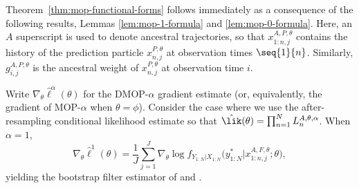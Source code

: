 

Theorem~\ref{thm:mop-functional-forms} follows immediately as a consequence of the following results, Lemmas \ref{lem:mop-1-formula} and \ref{lem:mop-0-formula}.
Here, an $A$ superscript is used to denote ancestral trajectories, so that $x_{1:n,j}^{A, P,\theta}$ contains the history of the prediction particle $x_{n,j}^{P,\theta}$ at observation times $\seq{1}{n}$.
Similarly, $g_{i,j}^{A,P,\theta}$ is the ancestral weight of $x_{n,j}^{P,\theta}$ at observation time $i$.

\begin{lem}
\label{lem:mop-1-formula}
Write $\nabla_\theta \hat\ell^\alpha(\theta)$ for the DMOP-$\alpha$ gradient estimate (or, equivalently, the gradient of MOP-$\alpha$ when $\theta=\phi$).
Consider the case where we use the after-resampling conditional likelihood estimate so that $\hat\lik(\theta) = \prod_{n=1}^N L_n^{A, \theta, \alpha}$.
When $\alpha=1$,
    \begin{equation}
        \nabla_\theta \hat{\ell}^1(\theta) 
        = \frac{1}{J}\sum_{j=1}^J \nabla_\theta \log f_{Y_{1:N}|X_{1:N}}\big(y_{1:N}^* | x_{1:n,j}^{A, F,\theta};\theta\big),
    \end{equation}
    yielding the bootstrap filter estimator of \cite{poyiadjis11} and \cite{scibior21}.
\end{lem}

